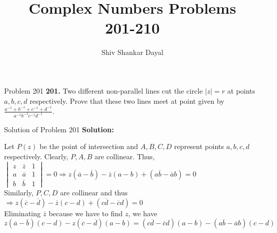 \documentclass[aspectratio=169,8pt]{beamer}
\title{Complex Numbers Problems\\ 201-210}
\author[Shiv Shankar Dayal]{Shiv Shankar Dayal}
\begin{document}
\begin{frame}
  \titlepage
\end{frame}
\begin{frame}{Problem 201}
  \textbf{201.} Two different non-parallel lines cut the circle $|z| = r$ at points $a, b, c, d$ respectively. Prove that these two
  lines meet at point given by $\frac{a^{-1} + b^{-1} + c^{-1} + d^{-1}}{a^{-1}b^{-1}c^{-1}d^{-1}}$.
\end{frame}
\begin{frame}{Solution of Problem 201}
  \textbf{Solution:}
  \begin{center}
  \end{center}
  Let $P(z)$ be the point of intersection and $A, B, C, D$ represent points $a, b, c, d$ respectively. Clearly, $P, A, B$ are
  collinear. Thus,\\
  \vspace*{0.2cm}
  $\begin{vmatrix}z & \overline{z} & 1\\a & \overline{a} & 1\\b & \overline{b} & 1\end{vmatrix} = 0 \Rightarrow z(\overline{a} -
    \overline{b}) - \overline{z}(a - b) + (a\overline{b} - \overline{a}b) = 0$\\
    \vspace*{0.2cm}
    Similarly, $P, C, D$ are collinear and thus\\
    \vspace*{0.2cm}
    $\Rightarrow z(\overline{c} - \overline{d}) - \overline{z}(c - d) + (c\overline{d} - \overline{c}d) = 0$\\
    \vspace*{0.2cm}
    Eliminating $\overline{z}$ because we have to find $z$, we have\\
    \vspace*{0.2cm}
    $z(\overline{a} - \overline{b})(c - d) - z(\overline{c} - \overline{d})(a - b) = (c\overline{d} - \overline{c}d)(a - b) -
    (a\overline{b} - \overline{a}b)(c - d)$
\end{frame}
\end{document}
